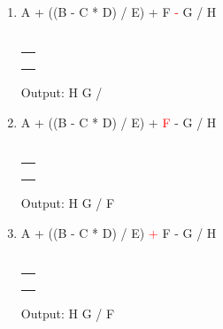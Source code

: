\documentclass[a4paper]{article}
\begin{document}
\begin{large}
\begin{enumerate}
          \renewcommand{\arraystretch}{1.3}
    \item
          A + ((B - C * D) / E) + F \textcolor{red}{-} G / H\\
          \\
          \begin{tabular}[t]{ | p{1em} | }
            \\ \hline
            \\ \hline \\ \hline \\ \hline
            \makecell{-} \\
            \hline
          \end{tabular}
          \hspace{2em}
          Output: H G /

          \renewcommand{\arraystretch}{1.3}
    \item
          A + ((B - C * D) / E) + \textcolor{red}{F} - G / H\\
          \\
          \begin{tabular}[t]{ | p{1em} | }
            \\ \hline
            \\ \hline \\ \hline \\ \hline
            \makecell{-} \\
            \hline
          \end{tabular}
          \hspace{2em}
          Output: H G / F

          \newpage

          \renewcommand{\arraystretch}{1.3}
    \item
          A + ((B - C * D) / E) \textcolor{red}{+} F - G / H\\\\
          \begin{tabular}[t]{ | p{1em} | }
            \\ \hline \\ \hline \\ \hline
            \makecell{+} \\\hline
            \makecell{-} \\\hline
          \end{tabular}
          \hspace{2em}
          Output: H G / F


\end{enumerate}
\end{large}
\end{document}
